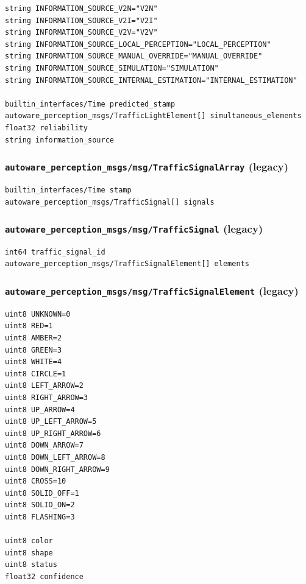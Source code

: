\documentclass[
]{article}
\begin{document}
\begin{verbatim}
string INFORMATION_SOURCE_V2N="V2N"
string INFORMATION_SOURCE_V2I="V2I"
string INFORMATION_SOURCE_V2V="V2V"
string INFORMATION_SOURCE_LOCAL_PERCEPTION="LOCAL_PERCEPTION"
string INFORMATION_SOURCE_MANUAL_OVERRIDE="MANUAL_OVERRIDE"
string INFORMATION_SOURCE_SIMULATION="SIMULATION"
string INFORMATION_SOURCE_INTERNAL_ESTIMATION="INTERNAL_ESTIMATION"

builtin_interfaces/Time predicted_stamp
autoware_perception_msgs/TrafficLightElement[] simultaneous_elements
float32 reliability
string information_source
\end{verbatim}

\subsubsection{\texorpdfstring{\texttt{autoware\_perception\_msgs/msg/TrafficSignalArray}
(legacy)}{autoware\_perception\_msgs/msg/TrafficSignalArray (legacy)}}\label{autoware_perception_msgsmsgtrafficsignalarray-legacy}

\begin{verbatim}
builtin_interfaces/Time stamp
autoware_perception_msgs/TrafficSignal[] signals
\end{verbatim}

\subsubsection{\texorpdfstring{\texttt{autoware\_perception\_msgs/msg/TrafficSignal}
(legacy)}{autoware\_perception\_msgs/msg/TrafficSignal (legacy)}}\label{autoware_perception_msgsmsgtrafficsignal-legacy}

\begin{verbatim}
int64 traffic_signal_id
autoware_perception_msgs/TrafficSignalElement[] elements
\end{verbatim}

\subsubsection{\texorpdfstring{\texttt{autoware\_perception\_msgs/msg/TrafficSignalElement}
(legacy)}{autoware\_perception\_msgs/msg/TrafficSignalElement (legacy)}}\label{autoware_perception_msgsmsgtrafficsignalelement-legacy}

\begin{verbatim}
uint8 UNKNOWN=0
uint8 RED=1
uint8 AMBER=2
uint8 GREEN=3
uint8 WHITE=4
uint8 CIRCLE=1
uint8 LEFT_ARROW=2
uint8 RIGHT_ARROW=3
uint8 UP_ARROW=4
uint8 UP_LEFT_ARROW=5
uint8 UP_RIGHT_ARROW=6
uint8 DOWN_ARROW=7
uint8 DOWN_LEFT_ARROW=8
uint8 DOWN_RIGHT_ARROW=9
uint8 CROSS=10
uint8 SOLID_OFF=1
uint8 SOLID_ON=2
uint8 FLASHING=3

uint8 color
uint8 shape
uint8 status
float32 confidence
\end{verbatim}
\end{document}
